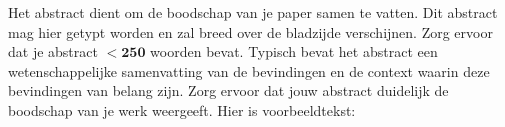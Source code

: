 Het abstract dient om de boodschap van je paper samen te vatten. 
Dit abstract mag hier getypt worden en zal breed over de bladzijde verschijnen. 
Zorg ervoor dat je abstract $\mathbf{< 250}$ woorden bevat. 
Typisch bevat het abstract een wetenschappelijke samenvatting van de bevindingen en de context waarin deze bevindingen van belang zijn.
Zorg ervoor dat jouw abstract duidelijk de boodschap van je werk weergeeft.
Hier is voorbeeldtekst: \lipsum[1-1]